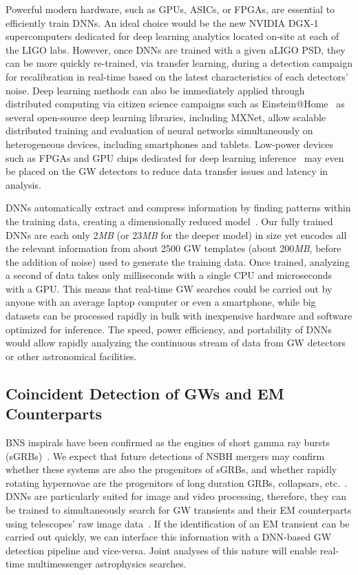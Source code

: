 \documentclass[aps,prd,%
amsmath,floats,floatfix, twocolumn, superscriptaddress,nofootinbib,showpacs]{revtex4-1}
\begin{document}
Powerful modern hardware, such as GPUs, ASICs, or FPGAs, are essential to efficiently train DNNs. An ideal choice would be the new NVIDIA DGX-1 supercomputers dedicated for deep learning analytics located on-site at each of the LIGO labs. However, once DNNs are trained with a given aLIGO PSD, they can be more quickly re-trained, via transfer learning, during a detection campaign for recalibration in real-time based on the latest characteristics of each detectors' noise. Deep learning methods can also be immediately applied through distributed computing via citizen science campaigns such as Einstein@Home~\cite{Einstein@Home} as several open-source deep learning libraries, including MXNet, allow scalable distributed training and evaluation of neural networks simultaneously on heterogeneous devices, including smartphones and tablets. Low-power devices such as FPGAs and GPU chips dedicated for deep learning inference~\cite{FPGA,GPUinference,InferenceEIE} may even be placed on the GW detectors to reduce data transfer issues and latency in analysis. %

DNNs automatically extract and compress information by finding patterns within the training data, creating a dimensionally reduced model~\cite{BengioScience}. Our fully trained DNNs are each only 2\textit{MB} (or 23\textit{MB} for the deeper model) in size yet encodes all the relevant information from about 2500 GW templates (about 200\textit{MB}, before the addition of noise) used to generate the training data. Once trained, analyzing a second of data takes only milliseconds with a single CPU and microseconds with a GPU. This means that real-time GW searches could be carried out by anyone with an average laptop computer or even a smartphone, while big datasets can be processed rapidly in bulk with inexpensive hardware and software optimized for inference. The speed, power efficiency, and portability of DNNs would allow rapidly analyzing the continuous stream of data from GW detectors or other astronomical facilities. 

\subsection*{Coincident Detection of GWs and EM Counterparts} 


BNS inspirals have been confirmed as the engines of short gamma ray bursts (sGRBs)~\cite{BNSdet:2017,Eichler:1989,Paczynski:1986,Narayan:1992,Kochanek:1993mw,mma:2017,Piran:2013M,Lee:2010,Lee:2007N}. We expect that future detections of NSBH mergers may confirm whether these systems are also the progenitors of sGRBs, and whether rapidly rotating hypernovae are the progenitors of long duration GRBs, collapsars, etc.~\cite{sum:2009CQGra,phi:2009astro2010S}. DNNs are particularly suited for image and video processing, therefore, they can be trained to simultaneously search for GW transients and their EM counterparts using telescopes' raw image data~\cite{CNNTransients}. If the identification of an EM transient can be carried out quickly, we can interface this information with a DNN-based GW detection pipeline and vice-versa. Joint analyses of this nature will enable real-time multimessenger astrophysics searches.
\end{document}
